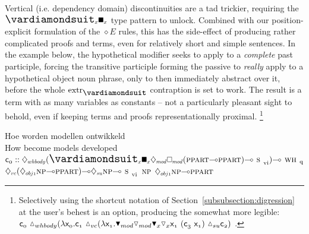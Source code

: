 Vertical (i.e. dependency domain) discontinuities are a tad trickier, requiring the $\dxdia{x}\dxbox{x}$ type pattern to unlock.
Combined with our position-explicit formulation of the $\diamond E$ rules, this has the side-effect of producing rather complicated proofs and terms, even for relatively short and simple sentences.
In the example below, the hypothetical modifier seeks to apply to a \textit{complete} past participle, forcing the transitive participle forming the passive to \textit{really} apply to a hypothetical object noun phrase, only to then immediately abstract over it, before the whole $\Extraction$ contraption is set to work.
The result is a term with as many variables as constants -- not a particularly pleasant sight to behold, even if keeping terms and proofs representationally proximal.%
	\footnote{Selectively using the shortcut notation of Section~\ref{subsubsection:digression} at the user's behest is an option, producing the somewhat more legible: $
			\con{0}~\ddiaintro{whbody}(
				\lam \Var{0}.
				\con{1}
				~\ddiaintro{vc}(\lam \Var{1}.\dboxelim{mod}\ddiaelim{mod}\dboxelim{x}\ddiaelim{x}\Var{1}~(\con{3}~\Var{1})
				~\ddiaintro{su}\con{2}				
			)
$
	 .}
\begin{exe}
\glll Hoe worden modellen ontwikkeld\\
How become models developed\\
	$\con{0}::\ddia{whbody}(\dxdia{x}\dxbox{x}\ddia{mod}\dbox{mod}(\ppart[s]\li\ppart[s])\li\svi[s])\li\whq[s]$
	$\ddia{vc}(\ddia{obj1}\np[s]\li\ppart[s])\li\ddia{su}\np[s]\li\svi[s]$
	$\np[s]$
	$\ddia{obj1}\np[s]\li\ppart[s]$\\
\end{exe}

